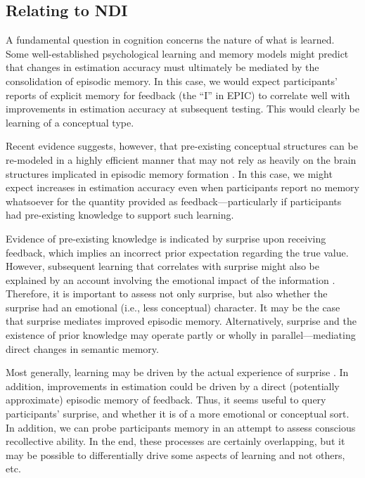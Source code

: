 
\subsection{Relating to NDI}

A fundamental question in cognition concerns the nature of what is learned. Some
well-established psychological learning and memory models
\parencite[e.g.,][]{nadel_memory_1997} might predict that changes in estimation accuracy must
ultimately be mediated by the consolidation of episodic memory. In this case, we
would expect participants' reports of explicit memory for feedback (the ``I'' in
EPIC) to correlate well with improvements in estimation accuracy at subsequent
testing.  This would clearly be learning of a conceptual type.

Recent evidence suggests, however, that pre-existing conceptual structures can
be re-modeled in a highly efficient manner that may not rely as heavily on the
brain structures implicated in episodic memory formation
\parencite{tse_schemas_2007,clark_assembling_2003}. In this case, we might expect
increases in estimation accuracy even when participants report no memory
whatsoever for the quantity provided as feedback---particularly if participants
had pre-existing knowledge to support such learning.

Evidence of pre-existing knowledge is indicated by surprise upon receiving
feedback, which implies an incorrect prior expectation regarding the true value.
However, subsequent learning that correlates with surprise might also be
explained by an account involving the emotional impact of the information
\parencite{munnich_surprise_2007,thagard_hot_2006}.  Therefore, it is important to
assess not only surprise, but also whether the surprise had an emotional (i.e.,
less conceptual) character. It may be the case that surprise mediates improved
episodic memory. Alternatively, surprise and the existence of prior knowledge
may operate partly or wholly in parallel---mediating direct changes in semantic
memory.

Most generally, learning may be driven by the actual experience of surprise
\parencite[e.g.,][]{munnich_longevities_2005,kang_wick_2009}.  In addition,
improvements in estimation could be driven by a direct (potentially approximate)
episodic memory of feedback. Thus, it seems useful to query participants'
surprise, and whether it is of a more emotional or conceptual sort. In addition,
we can probe participants memory in an attempt to assess conscious recollective
ability. In the end, these processes are certainly overlapping, but it may be
possible to differentially drive some aspects of learning and not others, etc.

